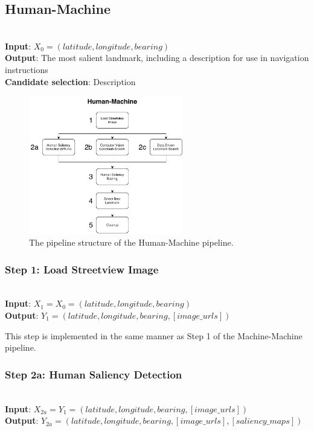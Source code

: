 \pagebreak
\subsection{Human-Machine}~\\
\noindent\textbf{Input}: $X_0 = (latitude, longitude, bearing)$\\
\noindent\textbf{Output}: The most salient landmark, including a description for use in navigation instructions\\
\textbf{Candidate selection}: Description

\begin{figure}[htbp]
  \centering
  \includegraphics[width=0.6\textwidth]{pipeline_diagrams/human-machine.pdf}
  \caption{The pipeline structure of the Human-Machine pipeline.}
  \label{fig:pipeline:hm}
\end{figure}

\subsubsection*{Step 1: Load Streetview Image}~\\
\noindent\textbf{Input}: $X_1 = X_0 = (latitude, longitude, bearing)$\\
\textbf{Output}: $Y_1 = (latitude, longitude, bearing, [image\_urls])$

This step is implemented in the same manner as Step 1 of the Machine-Machine pipeline.

\subsubsection*{Step 2a: Human Saliency Detection}~\\ 
\noindent\textbf{Input}: $X_{2a} = Y_1 = (latitude, longitude, bearing, [image\_urls])$\\
\textbf{Output}: $Y_{2a} = (latitude, longitude, bearing, [image\_urls], [saliency\_maps])$ 

